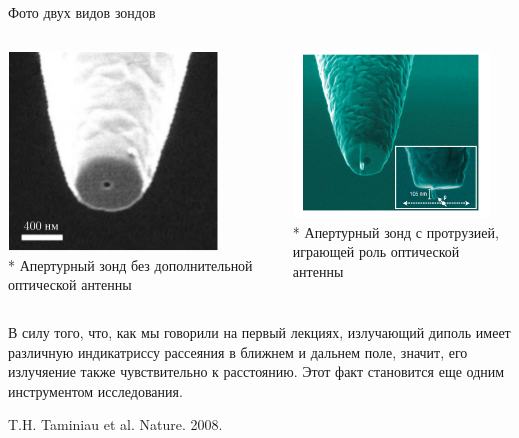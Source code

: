 \documentclass[9pt, compress, xcolor=table]{beamer}
\begin{document}

\begin{frame}{Фото двух видов зондов}
\begin{columns}[c]
\column{6.5cm}
\begin{center}
\includegraphics[width=0.8\textwidth]{nfm13}
\\* Апертурный зонд без дополнительной оптической антенны
\end{center}

\column{6.5cm}
\begin{center}
\includegraphics[width=0.9\textwidth]{nfm22}
\\* Апертурный зонд с протрузией, играющей роль оптической антенны
\end{center}
\end{columns}
В силу того, что, как мы говорили на первый лекциях, излучающий диполь имеет различную индикатриссу рассеяния в ближнем и дальнем поле, значит, его излучяение также чувствительно к расстоянию. Этот факт становится еще одним инструментом исследования.

T.H. Taminiau et al. Nature. 2008.

\end{frame}
\end{document}
